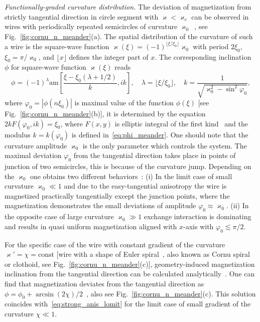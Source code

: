 {\it Functionally-graded curvature distribution.} The deviation of magnetization from  strictly tangential direction in circle segment with $\varkappa<\varkappa_c$ can be observed in wires with periodically repeated semicircles of curvature $\varkappa_0$~\cite{Korniienko19b}, see Fig.~\ref{fig:cornu_n_meander}(a). The spatial distribution of the curvature of such a wire is the square-wave function $\varkappa(\xi) = (-1)^{\lfloor\xi/\xi_0\rfloor}\varkappa_0$ with period $2\xi_0$, $\xi_0=\pi/\varkappa_0$, and $\lfloor x \rfloor$ defines the integer part of $x$. The corresponding inclination $\phi$ for square-wave function $\varkappa(\xi)$ reads~\cite{Korniienko19b}
\begin{equation}\label{eq:phi_meander}
\phi = (-1)^\lambda \text{am}\left[\frac{\xi-\xi_0\left(\lambda+1/2\right)}{k},ik\right],\quad \lambda=\lfloor \xi/\xi_0 \rfloor,\quad k=\frac{1}{\sqrt{\varkappa_0^2-\sin^2\varphi_0}},
\end{equation}
where $\varphi_0=|\phi\left(n\xi_0\right)|$ is maximal value of the function $\phi(\xi)$ [see Fig.~\ref{fig:cornu_n_meander}(b)], it is determined by the equation $2kF(\varphi_0,ik) = \xi_0$, where $F(x,y)$ is elliptic integral of the first kind~\cite{NIST10} and the modulus $k = k(\varphi_0)$ is defined in~\eqref{eq:phi_meander}. One should note that the curvature amplitude $\varkappa_0$ is the only parameter which controls the system. The maximal deviation $\varphi_0$ from the tangential direction takes place in points of junction of two semicircles, this is because of the curvature jump. Depending on the $\varkappa_0$ one obtains two different behaviors~\cite{Korniienko19b}: (i) In the limit case of small curvature $\varkappa_0\ll1$ and due to the easy-tangential anisotropy the wire is magnetized practically tangentially except the junction points, where the magnetization demonstrates the small deviations of amplitude $\varphi_0\approx\varkappa_0$. (ii) In the opposite case of large curvature $\varkappa_0\gg1$ exchange interaction is dominating and results in quasi uniform magnetization aligned with $x$-axis with $\varphi_0\lesssim\pi/2$.

For the specific case of the wire with constant gradient of the curvature $\varkappa'=\chi=\text{const}$ [wire with a shape of Euler spiral~\cite{Lawrence14}, also known as Cornu spiral or clothoid, see Fig.~\ref{fig:cornu_n_meander}(c)], geometry-induced magnetization inclination from the tangential direction can be calculated analytically~\cite{Yershov18a}. One can find that magnetization deviates from the tangential direction as $\phi=\phi_0+\arcsin(2\chi)/2$~\cite{Yershov18a}, also see Fig.~\ref{fig:cornu_n_meander}(c). This solution coincides with~\eqref{eq:strong_anis_lomit} for the limit case of small gradient of the curvature $\chi\ll1$.

